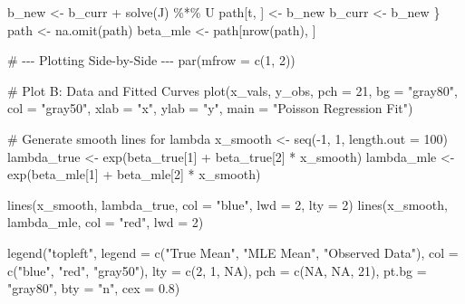 \documentclass[
  letterpaper,
  DIV=11,
  numbers=noendperiod]{scrreprt}
\newenvironment{Shaded}{\begin{snugshade}}{\end{snugshade}}
\newcommand{\AttributeTok}[1]{\textcolor[rgb]{0.40,0.45,0.13}{#1}}
\newcommand{\CommentTok}[1]{\textcolor[rgb]{0.37,0.37,0.37}{#1}}
\newcommand{\ConstantTok}[1]{\textcolor[rgb]{0.56,0.35,0.01}{#1}}
\newcommand{\DecValTok}[1]{\textcolor[rgb]{0.68,0.00,0.00}{#1}}
\newcommand{\FloatTok}[1]{\textcolor[rgb]{0.68,0.00,0.00}{#1}}
\newcommand{\FunctionTok}[1]{\textcolor[rgb]{0.28,0.35,0.67}{#1}}
\newcommand{\NormalTok}[1]{\textcolor[rgb]{0.00,0.23,0.31}{#1}}
\newcommand{\OtherTok}[1]{\textcolor[rgb]{0.00,0.23,0.31}{#1}}
\newcommand{\SpecialCharTok}[1]{\textcolor[rgb]{0.37,0.37,0.37}{#1}}
\newcommand{\StringTok}[1]{\textcolor[rgb]{0.13,0.47,0.30}{#1}}
\renewcommand{\[}{\begin{equation}}
\renewcommand{\]}{\end{equation}}
\theoremstyle{definition}
\theoremstyle{plain}
\theoremstyle{plain}
\theoremstyle{plain}
\theoremstyle{definition}
\theoremstyle{plain}
\theoremstyle{remark}
\begin{document}
\begin{Shaded}
\begin{Highlighting}[]
\NormalTok{  b\_new }\OtherTok{\textless{}{-}}\NormalTok{ b\_curr }\SpecialCharTok{+} \FunctionTok{solve}\NormalTok{(J) }\SpecialCharTok{\%*\%}\NormalTok{ U}
\NormalTok{  path[t, ] }\OtherTok{\textless{}{-}}\NormalTok{ b\_new}
\NormalTok{  b\_curr }\OtherTok{\textless{}{-}}\NormalTok{ b\_new}
\NormalTok{\}}
\NormalTok{path }\OtherTok{\textless{}{-}} \FunctionTok{na.omit}\NormalTok{(path)}
\NormalTok{beta\_mle }\OtherTok{\textless{}{-}}\NormalTok{ path[}\FunctionTok{nrow}\NormalTok{(path), ]}

\CommentTok{\# {-}{-}{-} Plotting Side{-}by{-}Side {-}{-}{-}}
\FunctionTok{par}\NormalTok{(}\AttributeTok{mfrow =} \FunctionTok{c}\NormalTok{(}\DecValTok{1}\NormalTok{, }\DecValTok{2}\NormalTok{))}


\CommentTok{\# Plot B: Data and Fitted Curves}
\FunctionTok{plot}\NormalTok{(x\_vals, y\_obs, }\AttributeTok{pch =} \DecValTok{21}\NormalTok{, }\AttributeTok{bg =} \StringTok{"gray80"}\NormalTok{, }\AttributeTok{col =} \StringTok{"gray50"}\NormalTok{,}
     \AttributeTok{xlab =} \StringTok{"x"}\NormalTok{, }\AttributeTok{ylab =} \StringTok{"y"}\NormalTok{, }\AttributeTok{main =} \StringTok{"Poisson Regression Fit"}\NormalTok{)}

\CommentTok{\# Generate smooth lines for lambda}
\NormalTok{x\_smooth }\OtherTok{\textless{}{-}} \FunctionTok{seq}\NormalTok{(}\SpecialCharTok{{-}}\DecValTok{1}\NormalTok{, }\DecValTok{1}\NormalTok{, }\AttributeTok{length.out =} \DecValTok{100}\NormalTok{)}
\NormalTok{lambda\_true }\OtherTok{\textless{}{-}} \FunctionTok{exp}\NormalTok{(beta\_true[}\DecValTok{1}\NormalTok{] }\SpecialCharTok{+}\NormalTok{ beta\_true[}\DecValTok{2}\NormalTok{] }\SpecialCharTok{*}\NormalTok{ x\_smooth)}
\NormalTok{lambda\_mle  }\OtherTok{\textless{}{-}} \FunctionTok{exp}\NormalTok{(beta\_mle[}\DecValTok{1}\NormalTok{] }\SpecialCharTok{+}\NormalTok{ beta\_mle[}\DecValTok{2}\NormalTok{] }\SpecialCharTok{*}\NormalTok{ x\_smooth)}

\FunctionTok{lines}\NormalTok{(x\_smooth, lambda\_true, }\AttributeTok{col =} \StringTok{"blue"}\NormalTok{, }\AttributeTok{lwd =} \DecValTok{2}\NormalTok{, }\AttributeTok{lty =} \DecValTok{2}\NormalTok{)}
\FunctionTok{lines}\NormalTok{(x\_smooth, lambda\_mle, }\AttributeTok{col =} \StringTok{"red"}\NormalTok{, }\AttributeTok{lwd =} \DecValTok{2}\NormalTok{)}

\FunctionTok{legend}\NormalTok{(}\StringTok{"topleft"}\NormalTok{, }\AttributeTok{legend =} \FunctionTok{c}\NormalTok{(}\StringTok{"True Mean"}\NormalTok{, }\StringTok{"MLE Mean"}\NormalTok{, }\StringTok{"Observed Data"}\NormalTok{),}
       \AttributeTok{col =} \FunctionTok{c}\NormalTok{(}\StringTok{"blue"}\NormalTok{, }\StringTok{"red"}\NormalTok{, }\StringTok{"gray50"}\NormalTok{), }\AttributeTok{lty =} \FunctionTok{c}\NormalTok{(}\DecValTok{2}\NormalTok{, }\DecValTok{1}\NormalTok{, }\ConstantTok{NA}\NormalTok{), }
       \AttributeTok{pch =} \FunctionTok{c}\NormalTok{(}\ConstantTok{NA}\NormalTok{, }\ConstantTok{NA}\NormalTok{, }\DecValTok{21}\NormalTok{), }\AttributeTok{pt.bg =} \StringTok{"gray80"}\NormalTok{, }\AttributeTok{bty =} \StringTok{"n"}\NormalTok{, }\AttributeTok{cex =} \FloatTok{0.8}\NormalTok{)}


\end{Highlighting}
\end{Shaded}
\end{document}
